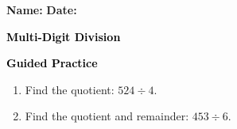 \documentclass[12pt, letterpaper, fleqn]{article}
\begin{document}
\textbf{Name:} \underline{\hspace{5cm}}
\hfill
\textbf{Date:} \underline{\hspace{3cm}}\\

\begin{tcolorbox}[colback=customteal!20]
    \large\textcolor{black}{\textbf{Multi-Digit Division}}
\end{tcolorbox}
\newpage
\begin{tcolorbox}[colback=customteal!20]
    \large\textcolor{black}{\textbf{Guided Practice}}
\end{tcolorbox}
\begin{enumerate}[itemsep=3.5cm, leftmargin=0.6cm]
\item Find the quotient: $524 \div 4$.
\vspace{3cm}
\item Find the quotient and remainder: $453 \div 6$.
\end{enumerate}
\end{document}
